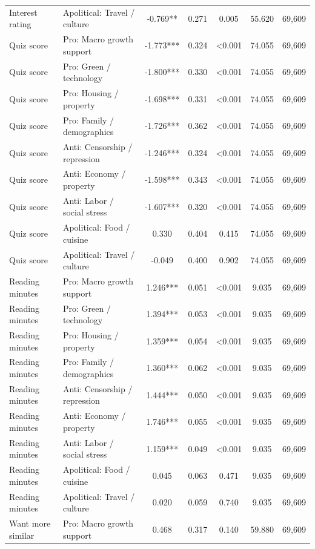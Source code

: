 \begin{table}[H]
\begin{threeparttable}
\begin{tabular}{llccccc}
Interest rating & Apolitical: Travel / culture & -0.769** & 0.271 & 0.005 & 55.620 & 69,609 \\
Quiz score & Pro: Macro growth support & -1.773*** & 0.324 & <0.001 & 74.055 & 69,609 \\
Quiz score & Pro: Green / technology & -1.800*** & 0.330 & <0.001 & 74.055 & 69,609 \\
Quiz score & Pro: Housing / property & -1.698*** & 0.331 & <0.001 & 74.055 & 69,609 \\
Quiz score & Pro: Family / demographics & -1.726*** & 0.362 & <0.001 & 74.055 & 69,609 \\
Quiz score & Anti: Censorship / repression & -1.246*** & 0.324 & <0.001 & 74.055 & 69,609 \\
Quiz score & Anti: Economy / property & -1.598*** & 0.343 & <0.001 & 74.055 & 69,609 \\
Quiz score & Anti: Labor / social stress & -1.607*** & 0.320 & <0.001 & 74.055 & 69,609 \\
Quiz score & Apolitical: Food / cuisine & 0.330 & 0.404 & 0.415 & 74.055 & 69,609 \\
Quiz score & Apolitical: Travel / culture & -0.049 & 0.400 & 0.902 & 74.055 & 69,609 \\
Reading minutes & Pro: Macro growth support & 1.246*** & 0.051 & <0.001 & 9.035 & 69,609 \\
Reading minutes & Pro: Green / technology & 1.394*** & 0.053 & <0.001 & 9.035 & 69,609 \\
Reading minutes & Pro: Housing / property & 1.359*** & 0.054 & <0.001 & 9.035 & 69,609 \\
Reading minutes & Pro: Family / demographics & 1.360*** & 0.062 & <0.001 & 9.035 & 69,609 \\
Reading minutes & Anti: Censorship / repression & 1.444*** & 0.050 & <0.001 & 9.035 & 69,609 \\
Reading minutes & Anti: Economy / property & 1.746*** & 0.055 & <0.001 & 9.035 & 69,609 \\
Reading minutes & Anti: Labor / social stress & 1.159*** & 0.049 & <0.001 & 9.035 & 69,609 \\
Reading minutes & Apolitical: Food / cuisine & 0.045 & 0.063 & 0.471 & 9.035 & 69,609 \\
Reading minutes & Apolitical: Travel / culture & 0.020 & 0.059 & 0.740 & 9.035 & 69,609 \\
Want more similar & Pro: Macro growth support & 0.468 & 0.317 & 0.140 & 59.880 & 69,609 \\

\end{tabular}
\end{threeparttable}
\end{table}

